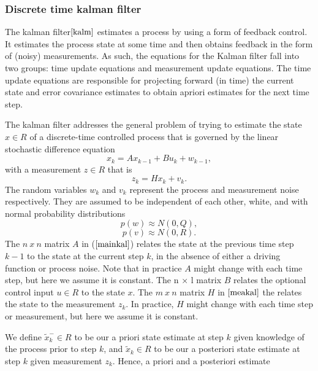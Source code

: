 \documentclass[a4paper,10pt]{report}
\begin{document}
\subsubsection{Discrete time kalman filter}
The kalman filter$\cite{kalm}$ estimates a process by using a form of feedback
control. It estimates the process state at some time and
then obtains feedback in the form of (noisy) measurements. As such,
the equations for the Kalman filter fall into two groups: time
update equations and measurement update equations. The time update
equations are responsible for projecting forward (in time) the
current state and error covariance estimates to obtain apriori
estimates for the next time step.
\par
The kalman filter addresses the general problem of trying to
estimate the state $x \in R$ of a discrete-time controlled process that is
governed by the linear stochastic difference equation
\begin{equation}
 x_k = Ax_{k-1} + Bu_k + w_{k-1} , \label{mainkal}
\end{equation}
with a measurement $z \in R$ that is
\begin{equation}
 z_k = Hx_k + v_k. \label{meakal}
\end{equation}
The random variables $w_k$ and $v_k$ represent the process and
measurement noise respectively. They are assumed to be
independent of each other, white, and with normal probability
distributions
\begin{equation}
 p(w) \approx N(0,Q),
\end{equation}
\begin{equation}
 p(v) \approx N(0,R).
\end{equation}
The $n\ x\ n$ matrix $A$ in ($\ref{mainkal}$) relates the state at
the previous time step $k-1$ to the state at the current step $k$,
in the absence of either a driving function or process noise. Note
that in practice $A$ might change with each time step, but here we
assume it is constant. The n × l matrix $B$ relates the optional
control input $u \in R$ to the state $x$. The $m\ x\ n$ matrix $H$
in $\ref{meakal}$ the relates the state to the measurement $z_k$. In
practice, $H$ might change with each time step or measurement, but
here we assume it is constant.
\par
We define $\tilde x_k^- \in R$ to be our a priori state estimate at
step $k$ given knowledge of the process prior to step $k$, and
$\tilde x_k \in R$ to be our a posteriori state estimate at step $k$
given measurement $z_k$. Hence, a priori and a posteriori estimate
\end{document}
